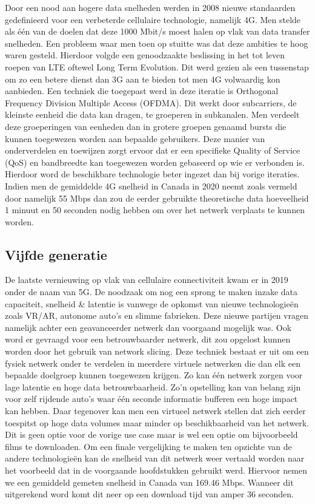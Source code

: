 Door een nood aan hogere data snelheden werden in 2008 nieuwe standaarden gedefinieerd voor een verbeterde cellulaire technologie, namelijk 4G. Men stelde als één van de doelen dat deze 1000 Mbit/s moest halen op vlak van data transfer snelheden. Een probleem waar men toen op stuitte was dat deze ambities te hoog waren gesteld. Hierdoor volgde een genoodzaakte beslissing in het tot leven roepen van LTE oftewel Long Term Evolution. Dit werd gezien als een tussenstap om zo een betere dienst dan 3G aan te bieden tot men 4G volwaardig kon aanbieden. \autocite{Nicholls2022} Een techniek die toegepast werd in deze iteratie is Orthogonal Frequency Division Multiple Access (OFDMA). Dit werkt door subcarriers, de kleinste eenheid die data kan dragen,  te groeperen in subkanalen. Men verdeelt deze groeperingen van eenheden dan in grotere groepen genaamd bursts die kunnen toegewezen worden aan bepaalde gebruikers. Deze manier van onderverdelen en toewijzen zorgt ervoor dat er een specifieke Quality of Service (QoS) en bandbreedte kan toegewezen worden gebaseerd op wie er verbonden is. Hierdoor word de beschikbare technologie beter ingezet dan bij vorige iteraties. \autocite{Friedmann2007} Indien men de gemiddelde 4G snelheid in Canada in 2020 neemt zoals vermeld door \textcite{Galazzo2020} namelijk 55 Mbps dan zou de eerder gebruikte theoretische data hoeveelheid 1 minuut en 50 seconden nodig hebben om over het netwerk verplaats te kunnen worden. \autocite{Wooding2024}

\subsection{Vijfde generatie}

De laatste vernieuwing op vlak van cellulaire connectiviteit kwam er in 2019 onder de naam van 5G. De noodzaak om nog een sprong te maken inzake data capaciteit, snelheid \& latentie is vanwege de opkomst van nieuwe technologieën zoals VR/AR, autonome auto's en slimme fabrieken. Deze nieuwe partijen vragen namelijk achter een geavanceerder netwerk dan voorgaand mogelijk was. Ook word er gevraagd voor een betrouwbaarder netwerk, dit zou opgelost kunnen worden door het gebruik van network slicing. Deze techniek bestaat er uit om een fysiek netwerk onder te verdelen in meerdere virtuele netwerken die dan elk een bepaalde doelgroep kunnen toegewezen krijgen. Zo kan één netwerk zorgen voor lage latentie en hoge data betrouwbaarheid. Zo'n opstelling kan van belang zijn voor zelf rijdende auto's waar één seconde informatie bufferen een hoge impact kan hebben. Daar tegenover kan men een virtueel netwerk stellen dat zich eerder toespitst op hoge data volumes maar minder op beschikbaarheid van het netwerk. Dit is geen optie voor de vorige use case maar is wel een optie om bijvoorbeeld films te downloaden. \autocite{Flinders2024} Om een finale vergelijking te maken ten opzichte van de andere technologieën kan de snelheid van dit netwerk weer vertaald worden naar het voorbeeld dat in de voorgaande hoofdstukken gebruikt werd. Hiervoor nemen we een gemiddeld gemeten snelheid in Canada van 169.46 Mbps. \autocite{Galazzo2020} Wanneer dit uitgerekend word komt dit neer op een download tijd van amper 36 seconden. \autocite{Wooding2024}

